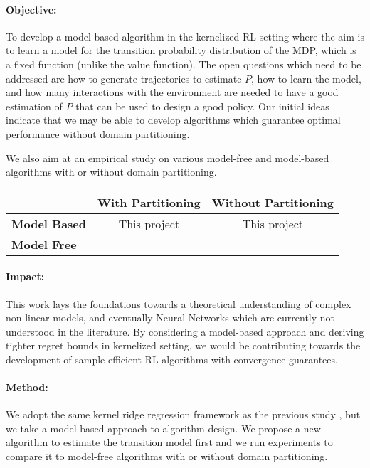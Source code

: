 \documentclass{article}
\begin{document}
\paragraph{Objective:}
To develop a model based algorithm 
in the kernelized RL setting where the aim is to learn a model for the transition probability distribution of the MDP, which is a fixed function (unlike the value function). The open questions which need to be addressed are how to generate trajectories to estimate $P$, how to learn the model, and how many interactions with the environment are needed to have a good estimation of $P$ that can be used to design a good policy. Our initial ideas indicate that we may be able to develop algorithms which guarantee optimal performance without domain partitioning. 

We also aim at an empirical study on various model-free and model-based algorithms with or without domain partitioning. 

\begin{table}[h]
\centering

\label{tab:comparison}
\begin{tabular}{@{}lcc@{}}
\toprule
 & \textbf{With Partitioning} & \textbf{Without Partitioning} \\ \midrule
\textbf{Model Based} & This project & This project \\
\textbf{Model Free} & \cite{vakili2024kernelized} & \cite{yang2020provably} \\
\bottomrule
\end{tabular}
\end{table}


\paragraph{Impact:}
This work lays the foundations towards a theoretical understanding of complex non-linear models, and eventually Neural Networks which are currently not understood in the literature. By considering a model-based approach and deriving tighter regret bounds in kernelized setting, we would be contributing towards the development of sample efficient RL algorithms with convergence guarantees.
\paragraph{Method:}
We adopt the same kernel ridge regression framework as the previous study \cite{vakili2024kernelized}, but we take a model-based approach to algorithm design. We propose a new algorithm to estimate the transition model first and we run experiments to compare it to model-free algorithms with or without domain partitioning.
\end{document}
